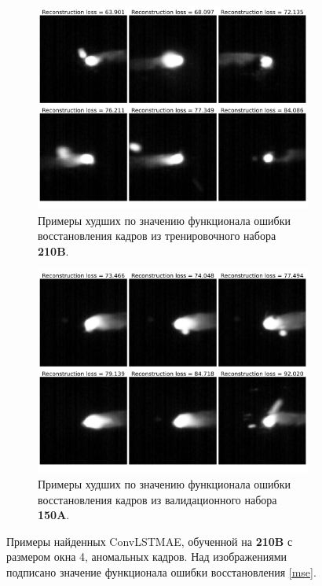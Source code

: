 \documentclass{article}
\begin{document}
    \begin{figure}[]
        \centering
        \begin{subfigure}{.47\textwidth}
            \centering
            \includegraphics[scale=.15]{model_4_after_train_worst.pdf}
            \caption{Примеры худших по значению функционала ошибки восстановления кадров из тренировочного набора \textbf{210B}.}\label{model_4_after_train_worst}
        \end{subfigure}
        \hfill
        \begin{subfigure}{.47\textwidth}
            \centering
            \includegraphics[scale=.15]{model_4_after_test_worst.pdf}
            \caption{Примеры худших по значению функционала ошибки восстановления кадров из валидационного набора \textbf{150A}.}\label{model_4_after_test_worst}
        \end{subfigure}
        \caption{Примеры найденных ConvLSTMAE, обученной на \textbf{210B} с размером окна 4, аномальных кадров. Над изображениями подписано значение функционала ошибки восстановления \eqref{mse}.}\label{lstm_worst_after}
    \end{figure}
\end{document}
